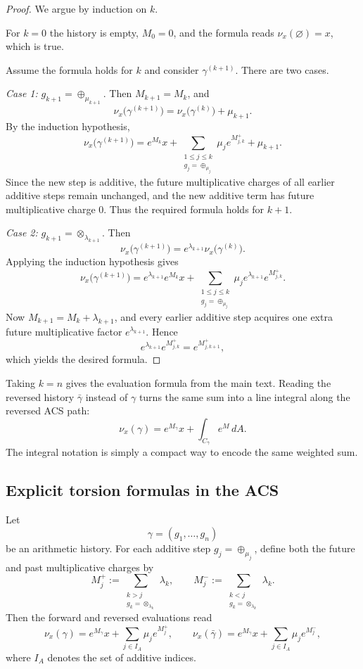 \begin{proof}
We argue by induction on $k$.

For $k=0$ the history is empty, $M_0=0$, and the formula reads $\nu_x(\varnothing)=x$, which is true.

Assume the formula holds for $k$ and consider $\gamma^{(k+1)}$.
There are two cases.

\smallskip
\noindent
\emph{Case 1:} $g_{k+1}=\oplus_{\mu_{k+1}}$.
Then $M_{k+1}=M_k$, and
\[
\nu_x\bigl(\gamma^{(k+1)}\bigr)
 =\nu_x\bigl(\gamma^{(k)}\bigr)+\mu_{k+1}.
\]
By the induction hypothesis,
\[
\nu_x\bigl(\gamma^{(k+1)}\bigr)
 =e^{M_k}x
 +\sum_{\substack{1\le j\le k\\ g_j=\oplus_{\mu_j}}}\mu_j e^{M^+_{j,k}}
 +\mu_{k+1}.
\]
Since the new step is additive, the future multiplicative charges of all earlier additive steps remain unchanged, and the new additive term has future multiplicative charge $0$. Thus the required formula holds for $k+1$.

\smallskip
\noindent
\emph{Case 2:} $g_{k+1}=\otimes_{\lambda_{k+1}}$.
Then
\[
\nu_x\bigl(\gamma^{(k+1)}\bigr)
 =e^{\lambda_{k+1}}\nu_x\bigl(\gamma^{(k)}\bigr).
\]
Applying the induction hypothesis gives
\[
\nu_x\bigl(\gamma^{(k+1)}\bigr)
 =e^{\lambda_{k+1}}e^{M_k}x
 +\sum_{\substack{1\le j\le k\\ g_j=\oplus_{\mu_j}}}
   \mu_j e^{\lambda_{k+1}}e^{M^+_{j,k}}.
\]
Now $M_{k+1}=M_k+\lambda_{k+1}$, and every earlier additive step acquires one extra future multiplicative factor $e^{\lambda_{k+1}}$. Hence
\[
 e^{\lambda_{k+1}}e^{M^+_{j,k}} = e^{M^+_{j,k+1}},
\]
which yields the desired formula.
\end{proof}

Taking $k=n$ gives the evaluation formula from the main text. Reading the reversed history $\bar\gamma$ instead of $\gamma$ turns the same sum into a line integral along the reversed ACS path:
\[
\nu_x(\gamma)=e^{M_\gamma}x+\int_{C_{\bar\gamma}}e^M\,dA.
\]
The integral notation is simply a compact way to encode the same weighted sum.

\subsection{Explicit torsion formulas in the ACS}
\label{appC:explicit-torsion-formulas}

Let
\[
\gamma=(g_1,\dots,g_n)
\]
be an arithmetic history. For each additive step $g_j=\oplus_{\mu_j}$, define both the future and past multiplicative charges by
\[
 M_j^+ := \sum_{\substack{k>j\\ g_k=\otimes_{\lambda_k}}}\lambda_k,
 \qquad
 M_j^- := \sum_{\substack{k<j\\ g_k=\otimes_{\lambda_k}}}\lambda_k.
\]
Then the forward and reversed evaluations read
\[
\nu_x(\gamma)=e^{M_\gamma}x+\sum_{j\in I_A}\mu_j e^{M_j^+},
\qquad
\nu_x(\bar\gamma)=e^{M_\gamma}x+\sum_{j\in I_A}\mu_j e^{M_j^-},
\]
where $I_A$ denotes the set of additive indices.

